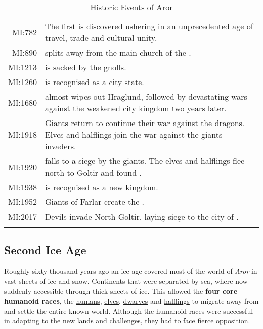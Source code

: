 \begin{longtable}{@{\,}r <{\hskip 6pt} !{
  \color{LightSteelBlue3}
  \makebox[0pt]{\textbullet}
  \hskip -2.6pt
  \vrule width 1pt
  \hspace{\labelsep}
  }
  >{\raggedright\arraybackslash}p{11cm}
}
    MI:782           & The first  is discovered
                       ushering in an unprecedented age of travel, trade and
                       cultural unity. \\
    MI:890           &  splits away from the
                       main church of the . \\
    MI:1213          &  is sacked by the gnolls. \\
    MI:1260          &  is recognised as a city state. \\
    MI:1680          &  almost wipes out
                       Hraglund, followed by devastating wars against the
                       weakened city kingdom two years later. \\
    MI:1918          & Giants return to continue their war against the dragons.
                       Elves and halflings join the war against the giants
                       invaders. \\
    MI:1920          &  falls to a siege by the giants.
                       The elves and halflings flee north to Goltir and found
                       . \\
    MI:1938          &  is recognised as a new kingdom. \\
    MI:1952          & Giants of Farlar create the . \\
    MI:2017          & Devils invade North Goltir, laying siege to the city
                       of . \\
  \caption{Historic Events of Aror}
\end{longtable}
\twocolumn
\clearpage

\subsection{Second Ice Age}
\label{sec:Second Ice Age}

Roughly sixty thousand years ago an ice age covered most of the world
of \emph{Aror} in vast sheets of ice and snow. Continents that were separated
by sea, where now suddenly accessible through thick sheets of ice. This
allowed the \textbf{four core humanoid races}, the
\hyperref[sec:Humans]{humans}, \hyperref[sec:Elves]{elves},
\hyperref[sec:Dwarves]{dwarves} and \hyperref[sec:Halflings]{halflings}
to migrate away from  and settle the entire known
world. Although the humanoid races were successful in adapting to the new
lands and challenges, they had to face fierce opposition.

